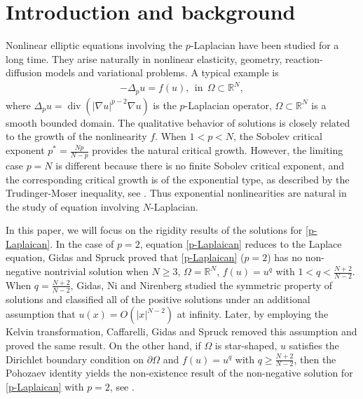 \documentclass[reqno, 11pt]{amsart} %
\numberwithin{equation}{section}
\theoremstyle{definition}
\newcommand{\pa}{\partial}
\newcommand{\R}{\mathbb{R}}
\begin{document}
\section{Introduction and background}

Nonlinear elliptic equations involving the $p$-Laplacian have been studied for a long time. They arise naturally in nonlinear elasticity, geometry, reaction-diffusion models and variational problems. A typical example is
\begin{align}\label{p-Laplaican}
    -\Delta_p u=f(u), \ \ \text{in} \ \ \Omega \subset \R^N,
\end{align}
where $\Delta_p u=\operatorname{div}(|\nabla u|^{p-2}\nabla u)$ is the $p$-Laplacian operator, $\Omega\subset \R^N$ is a smooth bounded domain. The qualitative behavior of solutions is closely related to the growth of the nonlinearity $f$. When $1<p<N$, the Sobolev critical exponent $p^*=\frac{Np}{N-p}$ provides the natural critical growth. However, the limiting case $p=N$ is different because there is no finite Sobolev critical exponent, and the corresponding critical growth is of the exponential type, as described by the Trudinger-Moser inequality, see \cite{S1071, T1967}. Thus exponential nonlinearities are natural in the study of equation involving $N$-Laplacian.

In this paper, we will focus on the rigidity results of the solutions for \eqref{p-Laplaican}. In the case of  $p=2$, equation \eqref{p-Laplaican} reduces to the Laplace equation, Gidas and Spruck \cite{GS1981} proved that \eqref{p-Laplaican} ($p=2$) has no non-negative nontrivial solution when $N \geq 3$, $\Omega = \R^N$, $f(u) = u^q$ with $1< q < \frac{N+2}{N-2}$. When $q=\frac{N+2}{N-2}$, Gidas, Ni and Nirenberg \cite{GNN1979} studied the symmetric property of solutions and classified all of the positive solutions under an additional assumption that $u(x) = O(|x|^{N-2})$ at infinity. Later, by employing the Kelvin transformation, Caffarelli, Gidas and Spruck \cite{CGS1989} removed this assumption and proved the same result. On the other hand, if $\Omega$ is star-shaped, $u$ satisfies the Dirichlet boundary condition on $\pa\Omega$ and $f(u) = u^q$ with $q \geq \frac{N+2}{N-2}$, then the Pohozaev identity yields the non-existence result of the non-negative solution for \eqref{p-Laplaican} with $p=2$, see \cite{P1965}.
\end{document}
